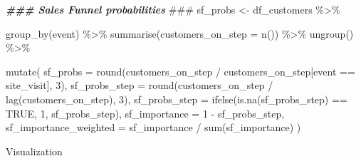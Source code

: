 \documentclass[
]{book}
\newenvironment{Shaded}{\begin{snugshade}}{\end{snugshade}}
\newcommand{\AlertTok}[1]{\textcolor[rgb]{0.94,0.16,0.16}{#1}}
\newcommand{\AttributeTok}[1]{\textcolor[rgb]{0.77,0.63,0.00}{#1}}
\newcommand{\ConstantTok}[1]{\textcolor[rgb]{0.00,0.00,0.00}{#1}}
\newcommand{\DecValTok}[1]{\textcolor[rgb]{0.00,0.00,0.81}{#1}}
\newcommand{\DocumentationTok}[1]{\textcolor[rgb]{0.56,0.35,0.01}{\textbf{\textit{#1}}}}
\newcommand{\FunctionTok}[1]{\textcolor[rgb]{0.00,0.00,0.00}{#1}}
\newcommand{\NormalTok}[1]{#1}
\newcommand{\OtherTok}[1]{\textcolor[rgb]{0.56,0.35,0.01}{#1}}
\newcommand{\SpecialCharTok}[1]{\textcolor[rgb]{0.00,0.00,0.00}{#1}}
\newcommand{\StringTok}[1]{\textcolor[rgb]{0.31,0.60,0.02}{#1}}
\begin{document}
\begin{Shaded}
\begin{Highlighting}[]
\DocumentationTok{\#\#\# Sales Funnel probabilities }\AlertTok{\#\#\#}
\NormalTok{sf\_probs }\OtherTok{\textless{}{-}}\NormalTok{ df\_customers }\SpecialCharTok{\%\textgreater{}\%}
    
    \FunctionTok{group\_by}\NormalTok{(event) }\SpecialCharTok{\%\textgreater{}\%}
    \FunctionTok{summarise}\NormalTok{(}\AttributeTok{customers\_on\_step =} \FunctionTok{n}\NormalTok{()) }\SpecialCharTok{\%\textgreater{}\%}
    \FunctionTok{ungroup}\NormalTok{() }\SpecialCharTok{\%\textgreater{}\%}
    
    \FunctionTok{mutate}\NormalTok{(}
        \AttributeTok{sf\_probs =} \FunctionTok{round}\NormalTok{(customers\_on\_step }\SpecialCharTok{/}\NormalTok{ customers\_on\_step[event }\SpecialCharTok{==} \StringTok{\textquotesingle{}site\_visit\textquotesingle{}}\NormalTok{], }\DecValTok{3}\NormalTok{),}
        \AttributeTok{sf\_probs\_step =} \FunctionTok{round}\NormalTok{(customers\_on\_step }\SpecialCharTok{/} \FunctionTok{lag}\NormalTok{(customers\_on\_step), }\DecValTok{3}\NormalTok{),}
        \AttributeTok{sf\_probs\_step =} \FunctionTok{ifelse}\NormalTok{(}\FunctionTok{is.na}\NormalTok{(sf\_probs\_step) }\SpecialCharTok{==} \ConstantTok{TRUE}\NormalTok{, }\DecValTok{1}\NormalTok{, sf\_probs\_step),}
        \AttributeTok{sf\_importance =} \DecValTok{1} \SpecialCharTok{{-}}\NormalTok{ sf\_probs\_step,}
        \AttributeTok{sf\_importance\_weighted =}\NormalTok{ sf\_importance }\SpecialCharTok{/} \FunctionTok{sum}\NormalTok{(sf\_importance)}
\NormalTok{    )}
\end{Highlighting}
\end{Shaded}

Visualization
\end{document}
